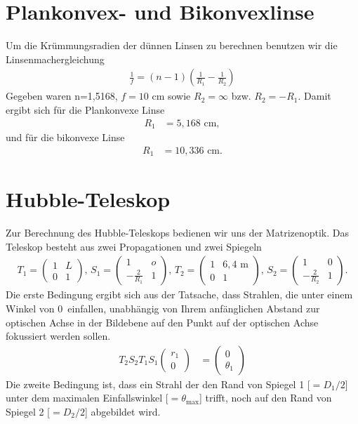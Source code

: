 \documentclass[twoside,colorback,accentcolor=tud4c,11pt]{tudreport}
\begin{document}
\section{Plankonvex- und Bikonvexlinse}
Um die Krümmungsradien der dünnen Linsen zu berechnen benutzen wir die Linsenmachergleichung
\begin{align}
\frac{1}{f}=(n-1)\left(\frac{1}{R_1}-\frac{1}{R_2}\right)
\end{align}
Gegeben waren n=1,5168, $ f=10 $ cm sowie $ R_2=\infty $ bzw. $ R_2=-R_1 $. Damit ergibt sich für die Plankonvexe Linse
\begin{align}
R_1&=5,168\text{ cm},
\end{align}
und für die bikonvexe Linse
\begin{align}
R_1&=10,336\text{ cm}.
\end{align}
\section{Hubble-Teleskop}\label{sec:H2}
Zur Berechnung des Hubble-Teleskops bedienen wir uns der Matrizenoptik. Das Teleskop besteht aus zwei Propagationen und zwei Spiegeln
\begin{align}
T_1=\begin{pmatrix}
1&L\\
0&1
\end{pmatrix},\,
S_1=\begin{pmatrix}
1&o\\
-\frac{2}{R_1}&1
\end{pmatrix},\,
T_2=\begin{pmatrix}
1&6,4\text{ m}\\
0&1
\end{pmatrix},\,
S_2=\begin{pmatrix}
1&0\\
-\frac{2}{R_2}&1
\end{pmatrix}.
\end{align} 
\glqq Die erste Bedingung ergibt sich aus der Tatsache, dass Strahlen, die unter einem Winkel von 0\degree\, einfallen, unabhängig von Ihrem anfänglichen Abstand zur optischen Achse in der Bildebene auf den Punkt auf der optischen Achse fokussiert werden sollen.\grqq\, \cite{anl}
\begin{align}
T_2S_2T_1S_1\begin{pmatrix}
r_1\\
0
\end{pmatrix}
&=\begin{pmatrix}
0\\
\theta_1
\end{pmatrix}
\end{align}
\glqq Die zweite Bedingung ist, dass ein Strahl der den Rand von Spiegel 1 [$ =D_1/2 $] unter dem maximalen Einfallswinkel [$ =\theta_{\text{max}} $] trifft, noch auf den Rand von Spiegel 2 [$ =D_2/2 $] abgebildet wird.\grqq\; \cite{anl}
\end{document}
